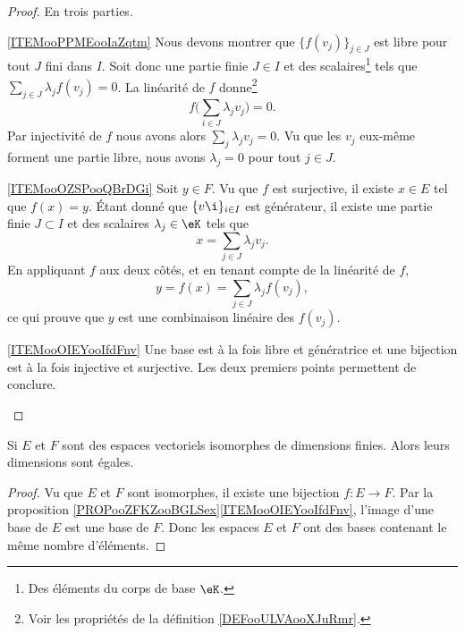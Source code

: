 \begin{proof}
    En trois parties.
    \begin{subproof}
        \item[\ref{ITEMooPPMEooIaZqtm}]
            Nous devons montrer que \( \{f(v_j)\}_{j\in J}\) est libre pour tout \( J\) fini dans \( I\). Soit donc une partie finie \( J\in I\) et des scalaires\footnote{Des éléments du corps de base \( \eK\).} tels que \( \sum_{j\in J}\lambda_jf(v_j)=0\). La linéarité de \( f\) donne\footnote{Voir les propriétés de la définition \ref{DEFooULVAooXJuRmr}.}
            \begin{equation}
                f\big( \sum_{i\in J}\lambda_jv_j \big)=0.
            \end{equation}
            Par injectivité de \( f\) nous avons alors \( \sum_j\lambda_jv_j=0\). Vu que les \( v_j\) eux-même forment une partie libre, nous avons \( \lambda_j=0\) pour tout \( j\in J\).
        \item[\ref{ITEMooOZSPooQBrDGi}]
            Soit \( y\in F\). Vu que \( f\) est surjective, il existe \( x\in E\) tel que \( f(x)=y\). Étant donné que \( \{v\i\}_{i\in I}\) est générateur, il existe une partie finie \( J\subset I\) et des scalaires \( \lambda_j\in \eK\) tels que
            \begin{equation}
                x=\sum_{j\in J}\lambda_jv_j.
            \end{equation}
            En appliquant \( f\) aux deux côtés, et en tenant compte de la linéarité de \( f\),
            \begin{equation}
                y=f(x)=\sum_{j\in J}\lambda_jf(v_j),
            \end{equation}
            ce qui prouve que \( y\) est une combinaison linéaire des \( f(v_j)\).
        \item[\ref{ITEMooOIEYooIfdFnv}]
            Une base est à la fois libre et génératrice et une bijection est à la fois injective et surjective. Les deux premiers points permettent de conclure.
    \end{subproof}
\end{proof}

\begin{corollary}        \label{CORooXIPKooWThOsr}
    Si \( E\) et \( F\) sont des espaces vectoriels isomorphes de dimensions finies. Alors leurs dimensions sont égales.
\end{corollary}

\begin{proof}
    Vu que \( E\) et \( F\) sont isomorphes, il existe une bijection \( f\colon E\to F\). Par la proposition \ref{PROPooZFKZooBGLSex}\ref{ITEMooOIEYooIfdFnv}, l'image d'une base de \( E\) est une base de \( F\). Donc les espaces \( E\) et \( F\) ont des bases contenant le même nombre d'éléments.
\end{proof}

